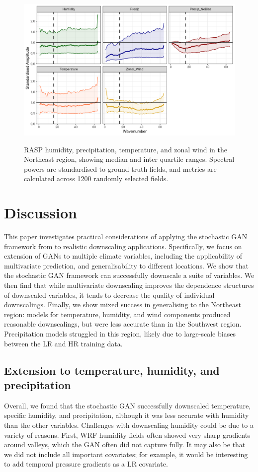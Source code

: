 \documentclass{ametsocV6.1}
\begin{document}
\begin{figure}[H]
  \noindent\includegraphics[width=\textwidth,angle=0]{final/Loc2_RASP_Precip_Coarsened.png}\\
  \caption{RASP humidity, precipitation, temperature, and zonal wind in the Northeast region, showing median and inter quartile ranges. Spectral powers are standardised to ground truth fields, and metrics are calculated across 1200 randomly selected fields.}\label{loc2_rasp}
\end{figure}

\section{Discussion}

This paper investigates practical considerations of applying the stochastic GAN framework from \citet{daust2024capturing} to realistic downscaling applications. Specifically, we focus on extension of GANs to multiple climate variables, including the applicability of multivariate prediction, and generalisability to different locations. We show that the stochastic GAN framework can successfully downscale a suite of variables. We then find that while multivariate downscaling improves the dependence structures of downscaled variables, it tends to decrease the quality of individual downscalings. Finally, we show mixed success in generalising to the Northeast region: models for temperature, humidity, and wind components produced reasonable downscalings, but were less accurate than in the Southwest region. Precipitation models struggled in this region, likely due to large-scale biases between the LR and HR training data.

\subsection{Extension to temperature, humidity, and precipitation}
Overall, we found that the stochastic GAN successfully downscaled temperature, specific humidity, and precipitation, although it was less accurate with humidity than the other variables. Challenges with downscaling humidity could be due to a variety of reasons. First, WRF humidity fields often showed very sharp gradients around valleys, which the GAN often did not capture fully. It may also be that we did not include all important covariates; for example, it would be interesting to add temporal pressure gradients as a LR covariate. 
\end{document}
